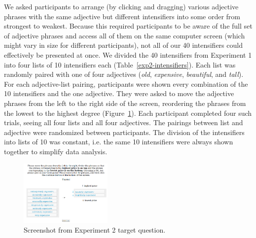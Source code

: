 \documentclass[10pt,letterpaper]{article}
\newcommand{\w}[1]{\emph{#1}}
\begin{document}
We asked participants to arrange (by clicking and dragging) various adjective phrases with the same adjective but different intensifiers into some order from strongest to weakest. Because this required participants to be aware of the full set of adjective phrases and access all of them on the same computer screen (which might vary in size for different participants), not all of our 40 intensifiers could effectively be presented at once. We divided the 40 intensifiers from Experiment 1 into four lists of 10 intensifiers each (Table~\ref{exp2-intensifiers}).
Each list was randomly paired with one of four adjectives (\w{old}, \w{expensive}, \w{beautiful}, and \w{tall}).
For each adjective-list pairing, participants were shown every combination of the 10 intensifiers and the one adjective.
They were asked to move the adjective phrases from the left to the right side of the screen, reordering the phrases from the lowest to the highest degree (Figure~\ref{exp2-q}).
Each participant completed four such trials, seeing all four lists and all four adjectives.
The pairings between list and adjective were randomized between participants.
The division of the intensifiers into lists of 10 was constant, i.e. the same 10 intensifiers were always shown together to simplify data analysis.

\begin{figure}[ht]
\begin{center}
\includegraphics[width=0.4\textwidth]{analysis_files_for_writeup/images/exp2-q.png}
\end{center}
\caption{Screenshot from Experiment 2 target question.} 
\label{exp2-q}
\end{figure}
\end{document}

